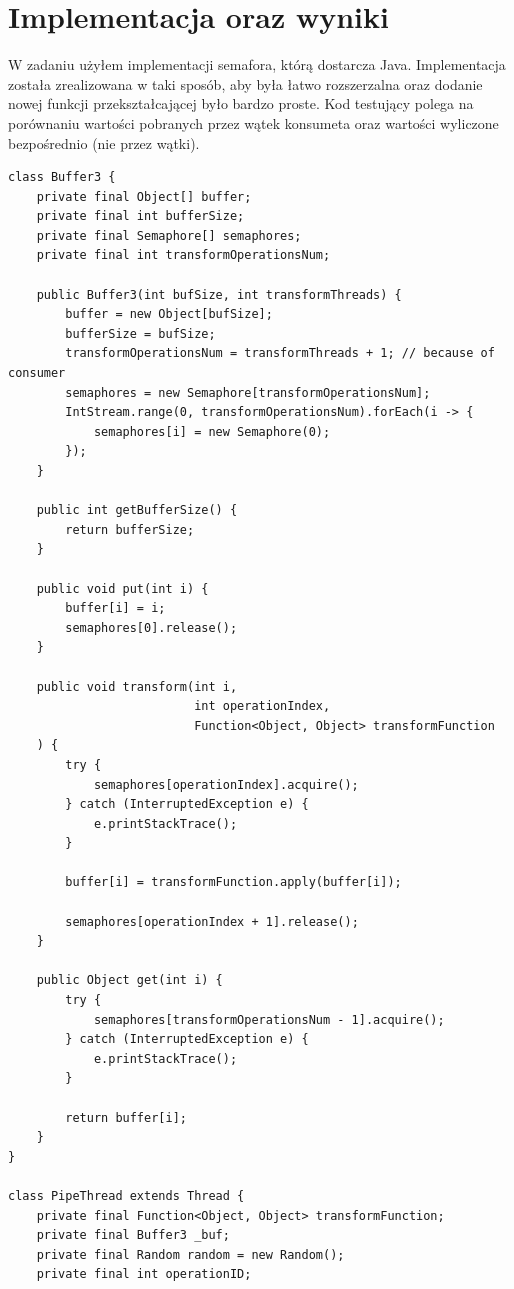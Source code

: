 \documentclass[12pt]{article}
\begin{document}
\section{Implementacja oraz wyniki}
W zadaniu użyłem implementacji semafora, którą dostarcza Java. Implementacja została zrealizowana w taki sposób, aby była łatwo rozszerzalna oraz dodanie nowej funkcji przekształcającej było bardzo proste. Kod testujący polega na porównaniu wartości pobranych przez wątek konsumeta oraz wartości wyliczone bezpośrednio (nie przez wątki). 

\begin{verbatim}
class Buffer3 {
    private final Object[] buffer;
    private final int bufferSize;
    private final Semaphore[] semaphores;
    private final int transformOperationsNum;

    public Buffer3(int bufSize, int transformThreads) {
        buffer = new Object[bufSize];
        bufferSize = bufSize;
        transformOperationsNum = transformThreads + 1; // because of consumer
        semaphores = new Semaphore[transformOperationsNum];
        IntStream.range(0, transformOperationsNum).forEach(i -> {
            semaphores[i] = new Semaphore(0);
        });
    }

    public int getBufferSize() {
        return bufferSize;
    }

    public void put(int i) {
        buffer[i] = i;
        semaphores[0].release();
    }

    public void transform(int i, 
                          int operationIndex, 
                          Function<Object, Object> transformFunction
    ) {
        try {
            semaphores[operationIndex].acquire();
        } catch (InterruptedException e) {
            e.printStackTrace();
        }

        buffer[i] = transformFunction.apply(buffer[i]);

        semaphores[operationIndex + 1].release();
    }

    public Object get(int i) {
        try {
            semaphores[transformOperationsNum - 1].acquire();
        } catch (InterruptedException e) {
            e.printStackTrace();
        }

        return buffer[i];
    }
}

class PipeThread extends Thread {
    private final Function<Object, Object> transformFunction;
    private final Buffer3 _buf;
    private final Random random = new Random();
    private final int operationID;


\end{verbatim}
\end{document}
